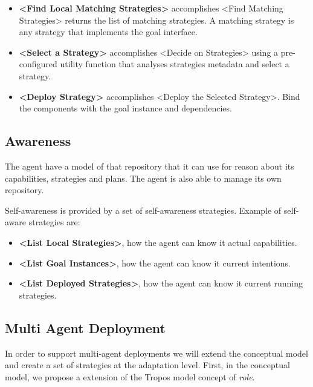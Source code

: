 \begin{itemize}
  \item \textbf{<Find Local Matching Strategies>} accomplishes <Find Matching Strategies>
  returns the list of matching strategies. A matching strategy is any strategy that implements the goal interface.

  \item \textbf{<Select a Strategy>} accomplishes <Decide on Strategies>
  using a pre-configured utility function that analyses strategies metadata and select a strategy.

  \item \textbf{<Deploy Strategy>} accomplishes <Deploy the Selected Strategy>. Bind the components with the goal instance and dependencies.
\end{itemize}

\subsection{Awareness}

The agent have a model of that repository that it can use for reason about its capabilities, strategies and plans. The agent is also able to manage its own repository.

Self-awareness is provided by a set of self-awareness strategies. Example of self-aware strategies are:

\begin{itemize}
  \item \textbf{<List Local Strategies>}, how the agent can know it actual capabilities.

  \item \textbf{<List Goal Instances>}, how the agent can know it current intentions.

  \item \textbf{<List Deployed Strategies>}, how the agent can know it current running strategies.

\end{itemize}


\subsection{Multi Agent Deployment}

In order to support multi-agent deployments we will extend the conceptual model and create a set of strategies at the adaptation level. First, in the conceptual model, we propose a extension of the Tropos model concept of \textit{role}.

